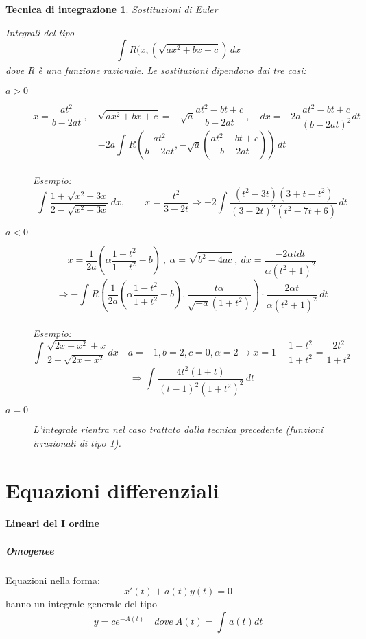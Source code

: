\documentclass[a4paper, titlepage]{report}%
\theoremstyle{definition} %
\theoremstyle{plain}
\theoremstyle{plain}
\theoremstyle{remark}
\theoremstyle{remark}
\theoremstyle{plain}
\theoremstyle{plain}
\theoremstyle{plain}
\theoremstyle{plain}
\theoremstyle{plain}
\newtheorem*{tecnica}{Tecnica di integrazione}
\begin{document}
\begin{tecnica}{Sostituzioni di Euler}
    
    Integrali del tipo 
    \[
        \int_{}^{} R(x,(\sqrt{ax^2+bx+c}) \, dx      
    \]
dove R è una funzione razionale. Le sostituzioni dipendono dai tre casi:
\begin{description}
    \item[$a>0$] 
    \[
      x = \frac{at^2}{b-2at} \ , \quad \sqrt{ax^2+bx+c} = -\sqrt{a}\frac{at^2-bt+c}
      {b-2at} \ , \quad dx = -2a\frac{at^2-bt+c}{(b-2at)^2}dt
    \] 
    \[
       -2a \int_{}^{} R(\frac{at^2}{b-2at}  ,  -\sqrt{a}(\frac{at^2-bt+c}{b-2at}))
       \, dt    
    \] \\
    Esempio: 
    \[
    \int_{}^{} \frac{1+\sqrt{x^2+3x}}{2-\sqrt{x^2+3x}} \, dx , \qquad x = \frac{t^2}{3-2t}
    \Longrightarrow -2\int_{}^{} \frac{(t^2-3t)(3+t-t^2)}{(3-2t)^2(t^2-7t+6)} \, dt
    \]

    \item[$a<0$]
    \[
    x = \frac{1}{2a}(\alpha \frac{1-t^2}{1+t^2}-b) \ , \ \alpha = \sqrt{b^2-4ac}  
    \ , \ dx = \frac{-2\alpha t dt}{\alpha(t^2+1)^2}  
    \]
    \[
        \Longrightarrow
       - \int_{}^{} R(\frac{1}{2a}(\alpha \frac{1-t^2}{1+t^2}-b), 
       \frac{t\alpha }{\sqrt{-a}(1+t^2)}) \cdot \frac{2\alpha t}{\alpha(t^2+1)^2}
       \, dt
    \] \\ Esempio:
    \[
    \int_{}^{} \frac{\sqrt{2x-x^2}+x}{2-\sqrt{2x-x^2}} \, dx
     \quad a = -1,b = 2, c= 0, \alpha = 2 \longrightarrow x = 1- \frac{1-t^2}
     {1+t^2} = \frac{2t^2}{1+t^2}   
    \]
    \[
      \Longrightarrow \int_{}^{} \frac{4t^2(1+t)}{(t-1)^2(1+t^2)^2}\,dt    
    \]
     
    \item[$a=0$] L'integrale rientra nel caso trattato dalla tecnica precedente
    (funzioni irrazionali di tipo 1).  
\end{description}

\end{tecnica}

\section*{Equazioni differenziali}

\paragraph*{Lineari del I ordine}
     \subparagraph*{Omogenee}
Equazioni nella forma:
     \[
          x'(t) + a(t)y(t) = 0  
     \]
hanno un integrale generale del tipo 
\[
      y = ce^{-A(t)}   \quad dove \ A(t) = \int_{}^{}a(t)dt    
\]
\end{document}
